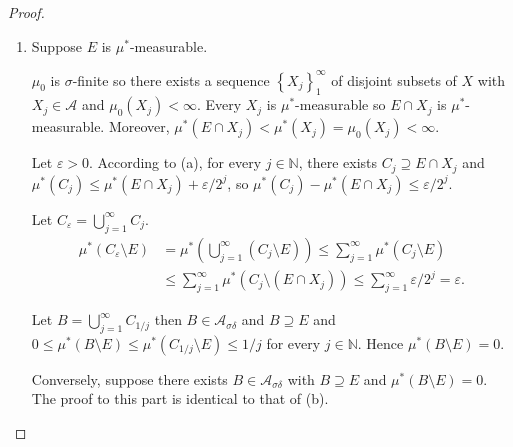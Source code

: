 \begin{proof}
\begin{enumerate}[itemsep=0pt,label={\textbf{\alph*.}}]
              Every set in \( \mathcal{A} \) is \( \mu^{\ast} \)-measurable then so are the sets in \( \mathcal{A}_{\sigma} \) and \( \mathcal{A}_{\sigma\delta} \), which means \( B \) is \( \mu^{\ast} \)-measurable.

              Because \( E \subseteq B \), it follows that \( E = B \setminus (B \setminus E) \) so \( E \) is \( \mu^{\ast} \)-measurable.

              Note that, in the converse part, we didn't make use of the assumption \( \mu^{\ast}(E) < \infty \).
        \item Suppose \( E \) is \( \mu^{\ast} \)-measurable.

              \( \mu_{0} \) is \( \sigma \)-finite so there exists a sequence \( {\left\{ X_{j} \right\}}_{1}^{\infty} \) of disjoint subsets of \( X \) with \( X_{j} \in \mathcal{A} \) and \( \mu_{0}(X_{j}) < \infty \). Every \( X_{j} \) is \( \mu^{\ast} \)-measurable so \( E \cap X_{j} \) is \( \mu^{\ast} \)-measurable. Moreover, \( \mu^{\ast}(E \cap X_{j}) < \mu^{\ast}(X_{j}) = \mu_{0}(X_{j}) < \infty \).

              Let \( \varepsilon > 0 \). According to (a), for every \( j \in \mathbb{N} \), there exists \( C_{j} \supseteq E \cap X_{j} \) and \( \mu^{\ast}(C_{j}) \le \mu^{\ast}(E \cap X_{j}) + \varepsilon/2^{j} \), so \( \mu^{\ast}(C_{j}) - \mu^{\ast}(E \cap X_{j}) \le \varepsilon/2^{j} \).

              Let \( C_{\varepsilon} = \bigcup_{j=1}^{\infty} C_{j} \).
              \begingroup
              \allowdisplaybreaks%
              \begin{align*}
                  \mu^{\ast}(C_{\varepsilon} \setminus E) & = \mu^{\ast}\left( \bigcup_{j=1}^{\infty} (C_{j} \setminus E) \right) \le \sum_{j=1}^{\infty} \mu^{\ast}(C_{j} \setminus E) \\
                                                          & \le \sum_{j=1}^{\infty} \mu^{\ast}(C_{j} \setminus (E \cap X_{j})) \le \sum_{j=1}^{\infty} \varepsilon/2^{j} = \varepsilon.
              \end{align*}
              \endgroup

              Let \( B = \bigcup_{j=1}^{\infty} C_{1/j} \) then \( B \in \mathcal{A}_{\sigma\delta} \) and \( B \supseteq E \) and \( 0 \le \mu^{\ast}(B \setminus E) \le \mu^{\ast}(C_{1/j} \setminus E) \le 1/j \) for every \( j \in \mathbb{N} \). Hence \( \mu^{\ast}(B \setminus E) = 0 \).

              \bigskip

              Conversely, suppose there exists \( B \in \mathcal{A}_{\sigma\delta} \) with \( B \supseteq E \) and \( \mu^{\ast}(B\setminus E) = 0 \). The proof to this part is identical to that of (b).
    \end{enumerate}
\end{proof}

